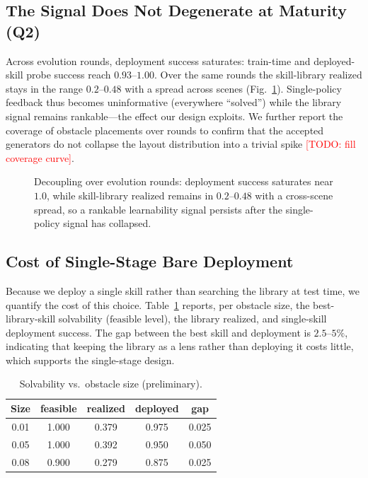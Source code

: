 \documentclass[conference]{IEEEtran}
\newcommand{\feasible}{\mathrm{feasible}}
\newcommand{\realized}{\mathrm{realized}}
\newcommand{\todo}[1]{\textcolor{red}{[TODO: #1]}}
\begin{document}
\subsection{The Signal Does Not Degenerate at Maturity (Q2)}
Across evolution rounds, deployment success saturates: train-time and
deployed-skill probe success reach $0.93$--$1.00$. Over the same rounds the
skill-library $\realized$ stays in the range $0.2$--$0.48$ with a spread across scenes
(Fig.~\ref{fig:decoupling}). Single-policy feedback thus becomes uninformative
(everywhere ``solved'') while the library signal remains rankable---the effect
our design exploits. We further report the coverage of obstacle placements over
rounds to confirm that the accepted generators do not collapse the layout
distribution into a trivial spike \todo{fill coverage curve}.

\begin{figure}[t]
\centering
{}
\caption{Decoupling over evolution rounds: deployment success saturates near
$1.0$, while skill-library $\realized$ remains in $0.2$--$0.48$ with a
cross-scene spread, so a rankable learnability signal persists after the
single-policy signal has collapsed.}
\label{fig:decoupling}
\end{figure}

\subsection{Cost of Single-Stage Bare Deployment}
Because we deploy a single skill rather than searching the library at test time,
we quantify the cost of this choice. Table~\ref{tab:gap} reports, per obstacle
size, the best-library-skill solvability ($\feasible$ level), the library
$\realized$, and single-skill deployment success. The gap between the best skill
and deployment is $2.5$--$5\%$, indicating that keeping the library as a lens
rather than deploying it costs little, which supports the single-stage design.

\begin{table}[t]
\caption{Solvability vs.\ obstacle size (preliminary).}
\label{tab:gap}
\centering
\begin{tabular}{ccccc}
\toprule
Size & feasible & realized & deployed & gap \\
\midrule
0.01 & 1.000 & 0.379 & 0.975 & 0.025 \\
0.05 & 1.000 & 0.392 & 0.950 & 0.050 \\
0.08 & 0.900 & 0.279 & 0.875 & 0.025 \\
\bottomrule
\end{tabular}
\end{table}
\end{document}
